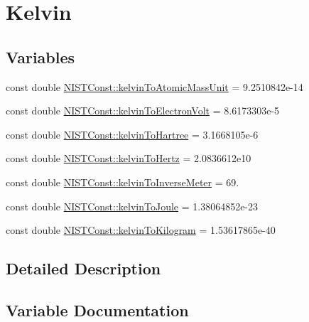 \hypertarget{group___kelvin}{}\section{Kelvin}
\label{group___kelvin}
\subsection*{Variables}
\begin{DoxyCompactItemize}
\item 
const double \hyperlink{group___kelvin_gadad57a8f65f4d323846c97fbe0c485b1}{N\+I\+S\+T\+Const\+::kelvin\+To\+Atomic\+Mass\+Unit} = 9.\+2510842e-\/14
\item 
const double \hyperlink{group___kelvin_gae61d97fa154d94e710c951a26bd47896}{N\+I\+S\+T\+Const\+::kelvin\+To\+Electron\+Volt} = 8.\+6173303e-\/5
\item 
const double \hyperlink{group___kelvin_gaece5622592a7f817204ca28c6d00d570}{N\+I\+S\+T\+Const\+::kelvin\+To\+Hartree} = 3.\+1668105e-\/6
\item 
const double \hyperlink{group___kelvin_gaa426666c20c9b04efcdcfd05f5a90cd9}{N\+I\+S\+T\+Const\+::kelvin\+To\+Hertz} = 2.\+0836612e10
\item 
const double \hyperlink{group___kelvin_ga361938b994609879a0377a94e49dacf2}{N\+I\+S\+T\+Const\+::kelvin\+To\+Inverse\+Meter} = 69.
\item 
const double \hyperlink{group___kelvin_gae77577280e3dd4a78d41af37076c8f8d}{N\+I\+S\+T\+Const\+::kelvin\+To\+Joule} = 1.\+38064852e-\/23
\item 
const double \hyperlink{group___kelvin_gaf5fcf341c9c92f8ede2f402989ae8de1}{N\+I\+S\+T\+Const\+::kelvin\+To\+Kilogram} = 1.\+53617865e-\/40
\end{DoxyCompactItemize}


\subsection{Detailed Description}


\subsection{Variable Documentation}
\mbox{\label{group___kelvin_gadad57a8f65f4d323846c97fbe0c485b1}} 
